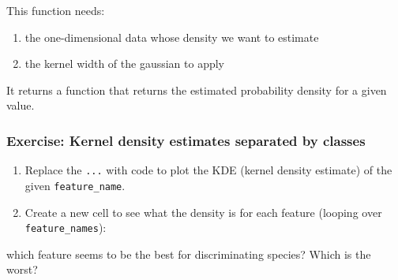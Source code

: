 \documentclass[8pt]{extarticle}
\providecommand{\tightlist}{%
      \setlength{\itemsep}{0pt}\setlength{\parskip}{0pt}}
\begin{document}
This function needs:

\begin{enumerate}
\def\labelenumi{\arabic{enumi}.}
\tightlist
\item
  the one-dimensional data whose density we want to estimate
\item
  the kernel width of the gaussian to apply
\end{enumerate}

It returns a function that returns the estimated probability density for
a given value.

    \subsubsection{Exercise: Kernel density estimates separated by
classes}\label{exercise-kernel-density-estimates-separated-by-classes}

\begin{enumerate}
\def\labelenumi{\arabic{enumi}.}
\tightlist
\item
  Replace the \texttt{...} with code to plot the KDE (kernel density
  estimate) of the given \texttt{feature\_name}.
\item
  Create a new cell to see what the density is for each feature (looping
  over \texttt{feature\_names}):
\end{enumerate}

which feature seems to be the best for discriminating species? Which is
the worst?
\end{document}
